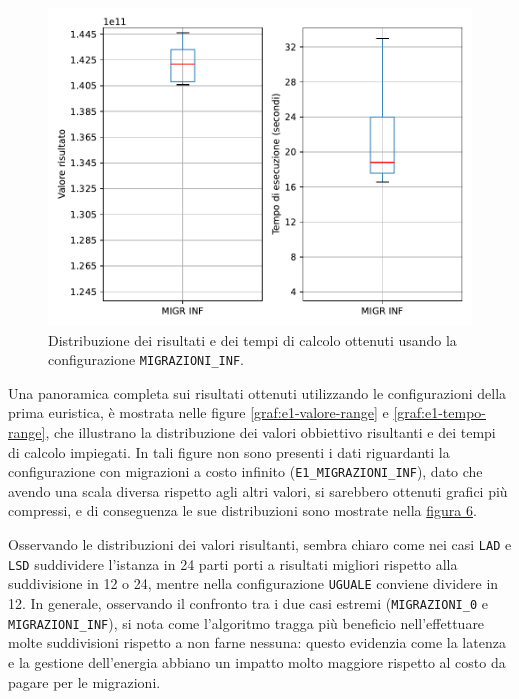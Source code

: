 \begin{figure}[H]
    \centering
    \includegraphics[scale=0.70]{img/grafico-e1-inf.pdf}
    \caption{Distribuzione dei risultati e dei tempi di calcolo ottenuti usando la configurazione \texttt{MIGRAZIONI\_INF}.}
    \label{graf:e1-inf}
\end{figure}

Una panoramica completa sui risultati ottenuti utilizzando le configurazioni della prima euristica, è mostrata nelle figure \ref{graf:e1-valore-range} e \ref{graf:e1-tempo-range}, che illustrano la distribuzione dei valori obbiettivo risultanti e dei tempi di calcolo impiegati. In tali figure non sono presenti i dati riguardanti la configurazione con migrazioni a costo infinito (\texttt{E1\_MIGRAZIONI\_INF}), dato che avendo una scala diversa rispetto agli altri valori, si sarebbero ottenuti grafici più compressi, e di conseguenza le sue distribuzioni sono mostrate nella \hyperref[graf:e1-inf]{figura 6}.

Osservando le distribuzioni dei valori risultanti, sembra chiaro come nei casi \texttt{LAD} e \texttt{LSD} suddividere l'istanza in 24 parti porti a risultati migliori rispetto alla suddivisione in 12 o 24, mentre nella configurazione \texttt{UGUALE} conviene dividere in 12. In generale, osservando il confronto tra i due casi estremi (\texttt{MIGRAZIONI\_0} e \texttt{MIGRAZIONI\_INF}), si nota come l'algoritmo tragga più beneficio nell'effettuare molte suddivisioni rispetto a non farne nessuna: questo evidenzia come la latenza e la gestione dell'energia abbiano un impatto molto maggiore rispetto al costo da pagare per le migrazioni.


